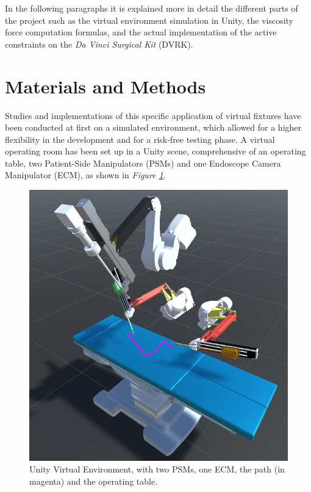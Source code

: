 \documentclass[conference]{IEEEtran}
\begin{document}
In the following paragraphs it is explained more in detail the different parts of the project such as the virtual environment simulation in Unity, the viscosity force computation formulas, and the actual implementation of the active constraints on the \textit{Da Vinci Surgical Kit} (DVRK).

\section{Materials and Methods}
Studies and implementations of this specific application of virtual fixtures have been conducted at first on a simulated environment, which allowed for a higher flexibility in the development and for a risk-free testing phase. A virtual operating room has been set up in a Unity scene, comprehensive of an operating table, two Patient-Side Manipulators (PSMs) and one Endoscope Camera Manipulator (ECM), as shown in \textit{Figure \ref{fig:Unity Scene}}. 
\begin{figure}[t]
    \centering
    \includegraphics[width=\linewidth]{unityscene.png}
    \caption{Unity Virtual Environment, with two PSMs, one ECM, the path (in magenta) and the operating table.}
    \label{fig:Unity Scene}
\end{figure}
\end{document}
